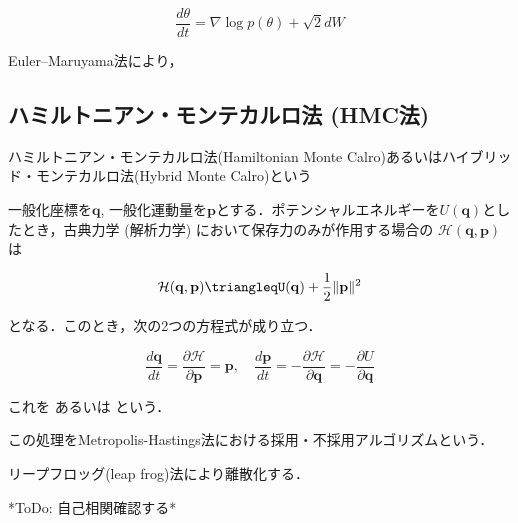 \begin{equation}
{\frac{d\theta}{dt}}=\nabla \log p (\theta)+{\sqrt 2}{d{W}}
\end{equation}


Euler–Maruyama法により，





\subsection{ハミルトニアン・モンテカルロ法 (HMC法)}
ハミルトニアン・モンテカルロ法(Hamiltonian Monte Calro)あるいはハイブリッド・モンテカルロ法(Hybrid Monte Calro)という

一般化座標を$\mathbf{q}$, 一般化運動量を$\mathbf{p}$とする．ポテンシャルエネルギーを$U(\mathbf{q})$としたとき，古典力学 (解析力学) において保存力のみが作用する場合の\textbf{} $\mathcal{H}(\mathbf{q}, \mathbf{p})$は


\begin{equation}
\mathcal{H}(\mathbf{q}, \mathbf{p})\triangleqU(\mathbf{q})+\frac{1}{2}\|\mathbf{p}\|^2
\end{equation}


となる．このとき，次の2つの方程式が成り立つ．


\begin{equation}
\frac{d\mathbf{q}}{dt}=\frac{\partial \mathcal{H}}{\partial \mathbf{p}}=\mathbf{p},\quad\frac{d\mathbf{p}}{dt}=-\frac{\partial \mathcal{H}}{\partial \mathbf{q}}=-\frac{\partial U}{\partial \mathbf{q}}
\end{equation}


これを\textbf{} あるいは\textbf{} という．


この処理をMetropolis-Hastings法における採用・不採用アルゴリズムという．

リープフロッグ(leap frog)法により離散化する．






*ToDo: 自己相関確認する*
